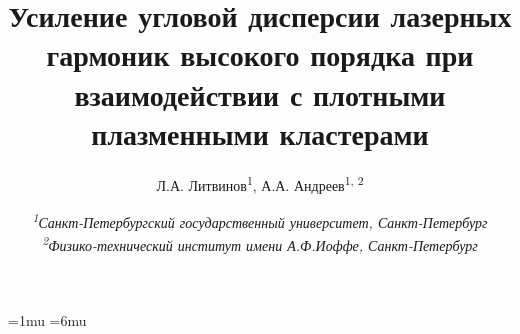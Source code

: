 \documentclass[10pt]{article}
\begin{document}



	\pagestyle{fancy}
	\fancyhf{}
	\fancyhead[L]{\textit{\nouppercase{\leftmark}}}
	\fancyfoot[C]{\thepage}

	\thinmuskip=1mu
	\thickmuskip=6mu
	\def\stacktype{S}\Sstackgap=-4.3pt
	\captionsetup[subfigure]{margin=0.05\textwidth}


	\newcommand{\subfigureautorefname}{\figureautorefname}
	\renewcommand{\thesubfigure}{\asbuk{subfigure}}


	\title{Усиление угловой дисперсии лазерных гармоник высокого порядка при взаимодействии с плотными плазменными кластерами}
	\author{
		Л.А. Литвинов\textsuperscript{1}, А.А. Андреев\textsuperscript{1, 2}
	}
	\date{
		\normalsize{\textit{\textsuperscript{1}Санкт-Петербургский государственный университет, Санкт-Петербург \\ \textsuperscript{2}Физико-технический институт имени А.Ф.Иоффе, Санкт-Петербург}}
	}
	\maketitle

	

	
	

	
	

	
	
\end{document}
